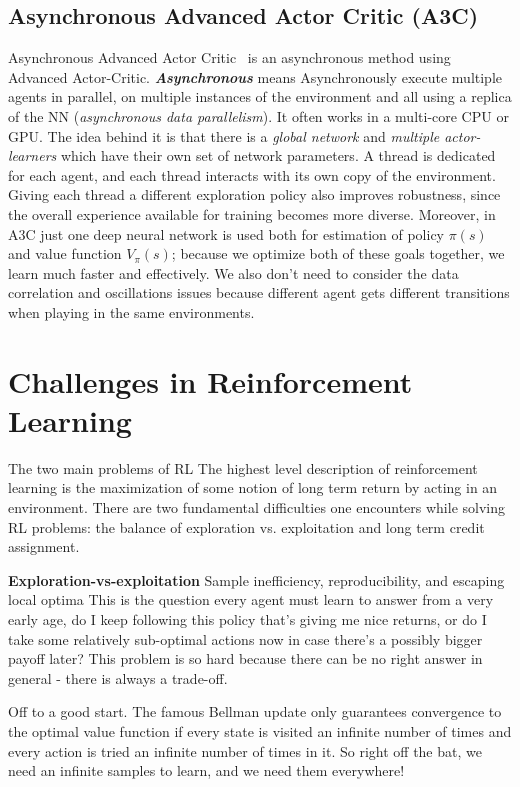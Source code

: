 \subsection{Asynchronous Advanced Actor Critic (\textbf{A3C})}
Asynchronous Advanced Actor Critic~\parencite{mnih2016asynchronous} is an asynchronous method using Advanced Actor-Critic. \textit{\textbf{Asynchronous}} means Asynchronously execute multiple agents in parallel, on multiple instances of the environment and all using a replica of the NN (\textit{asynchronous data parallelism}). It often works in a multi-core CPU or GPU. The idea behind it is that there is a \textit{global network} and \textit{multiple actor-learners} which have their own set of network parameters. A thread is dedicated for each agent, and each thread interacts with its own copy of the environment.
Giving each thread a different exploration policy also improves robustness, since the overall experience available for training becomes more diverse. Moreover, in A3C just one deep neural network is used both for estimation of policy $\pi(s)$ and value function $V_{\pi}(s)$; because we optimize both of these goals together, we learn much faster and effectively. We also don’t need to consider the data correlation and oscillations issues because different agent gets different transitions when playing in the same environments.

\clearpage

\section{Challenges in Reinforcement Learning} 

The two main problems of RL
The highest level description of reinforcement learning is the maximization of some notion of long term return by acting in an environment. There are two fundamental difficulties one encounters while solving RL problems: the balance of exploration vs. exploitation and long term credit assignment.


\textbf{Exploration-vs-exploitation}
Sample inefficiency, reproducibility, and escaping local optima
This is the question every agent must learn to answer from a very early age, do I keep following this policy that’s giving me nice returns, or do I take some relatively sub-optimal actions now in case there’s a possibly bigger payoff later? This problem is so hard because there can be no right answer in general - there is always a trade-off.

Off to a good start.
The famous Bellman update only guarantees convergence to the optimal value function if every state is visited an infinite number of times and every action is tried an infinite number of times in it. So right off the bat, we need an infinite samples to learn, and we need them everywhere!


